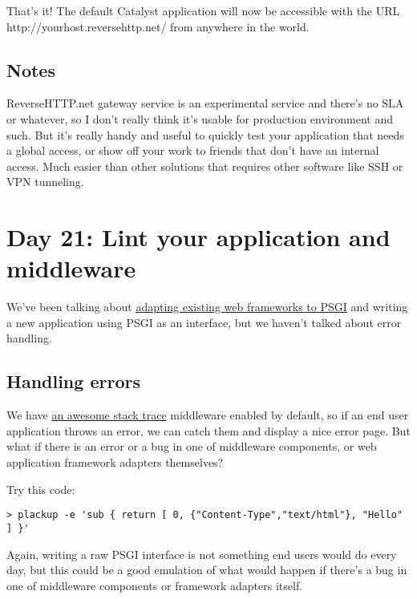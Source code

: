 That's it! The default Catalyst application will now be accessible with
the URL http://yourhost.reversehttp.net/ from anywhere in the world.

\section{Notes}\label{notes}

ReverseHTTP.net gateway service is an experimental service and there's
no SLA or whatever, so I don't really think it's usable for production
environment and such. But it's really handy and useful to quickly test
your application that needs a global access, or show off your work to
friends that don't have an internal access. Much easier than other
solutions that requires other software like SSH or VPN tunneling.

\chapter{Day 21: Lint your application and
middleware}\label{day-21-lint-your-application-and-middleware}

We've been talking about
\href{http://advent.plackperl.org/2009/12/day-8-adapting-web-frameworks-to-psgi.html}{adapting
existing web frameworks to PSGI} and writing a new application using
PSGI as an interface, but we haven't talked about error handling.

\section{Handling errors}\label{handling-errors}

We have
\href{http://advent.plackperl.org/2009/12/day-3-using-plackup.html}{an
awesome stack trace} middleware enabled by default, so if an end user
application throws an error, we can catch them and display a nice error
page. But what if there is an error or a bug in one of middleware
components, or web application framework adapters themselves?

Try this code:

\begin{lstlisting}
> plackup -e 'sub { return [ 0, {"Content-Type","text/html"}, "Hello" ] }'
\end{lstlisting}

Again, writing a raw PSGI interface is not something end users would do
every day, but this could be a good emulation of what would happen if
there's a bug in one of middleware components or framework adapters
itself.

